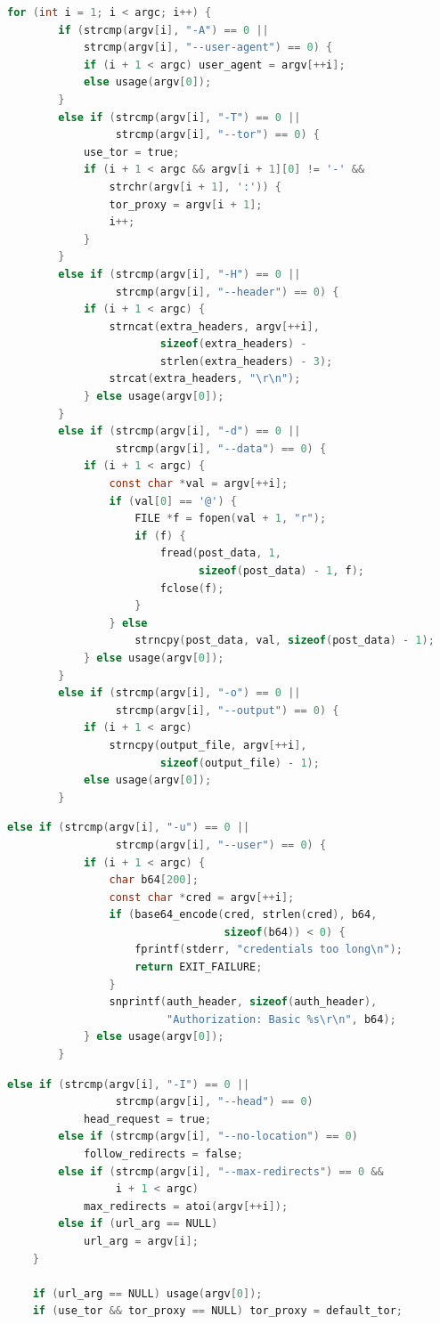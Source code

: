 \begin{lstlisting}[style=oldcode,language=C,firstnumber=last]
    for (int i = 1; i < argc; i++) {
        if (strcmp(argv[i], "-A") == 0 ||
            strcmp(argv[i], "--user-agent") == 0) {
            if (i + 1 < argc) user_agent = argv[++i];
            else usage(argv[0]);
        }
        else if (strcmp(argv[i], "-T") == 0 ||
                 strcmp(argv[i], "--tor") == 0) {
            use_tor = true;
            if (i + 1 < argc && argv[i + 1][0] != '-' &&
                strchr(argv[i + 1], ':')) {
                tor_proxy = argv[i + 1];
                i++;
            }
        }
        else if (strcmp(argv[i], "-H") == 0 ||
                 strcmp(argv[i], "--header") == 0) {
            if (i + 1 < argc) {
                strncat(extra_headers, argv[++i],
                        sizeof(extra_headers) -
                        strlen(extra_headers) - 3);
                strcat(extra_headers, "\r\n");
            } else usage(argv[0]);
        }
        else if (strcmp(argv[i], "-d") == 0 ||
                 strcmp(argv[i], "--data") == 0) {
            if (i + 1 < argc) {
                const char *val = argv[++i];
                if (val[0] == '@') {
                    FILE *f = fopen(val + 1, "r");
                    if (f) {
                        fread(post_data, 1,
                              sizeof(post_data) - 1, f);
                        fclose(f);
                    }
                } else
                    strncpy(post_data, val, sizeof(post_data) - 1);
            } else usage(argv[0]);
        }
        else if (strcmp(argv[i], "-o") == 0 ||
                 strcmp(argv[i], "--output") == 0) {
            if (i + 1 < argc)
                strncpy(output_file, argv[++i],
                        sizeof(output_file) - 1);
            else usage(argv[0]);
        }
\end{lstlisting}
\begin{lstlisting}[style=newcode,language=C,firstnumber=last]
        else if (strcmp(argv[i], "-u") == 0 ||
                 strcmp(argv[i], "--user") == 0) {
            if (i + 1 < argc) {
                char b64[200];
                const char *cred = argv[++i];
                if (base64_encode(cred, strlen(cred), b64,
                                  sizeof(b64)) < 0) {
                    fprintf(stderr, "credentials too long\n");
                    return EXIT_FAILURE;
                }
                snprintf(auth_header, sizeof(auth_header),
                         "Authorization: Basic %s\r\n", b64);
            } else usage(argv[0]);
        }
\end{lstlisting}
\begin{lstlisting}[style=oldcode,language=C,firstnumber=last]
        else if (strcmp(argv[i], "-I") == 0 ||
                 strcmp(argv[i], "--head") == 0)
            head_request = true;
        else if (strcmp(argv[i], "--no-location") == 0)
            follow_redirects = false;
        else if (strcmp(argv[i], "--max-redirects") == 0 &&
                 i + 1 < argc)
            max_redirects = atoi(argv[++i]);
        else if (url_arg == NULL)
            url_arg = argv[i];
    }

    if (url_arg == NULL) usage(argv[0]);
    if (use_tor && tor_proxy == NULL) tor_proxy = default_tor;
\end{lstlisting}
